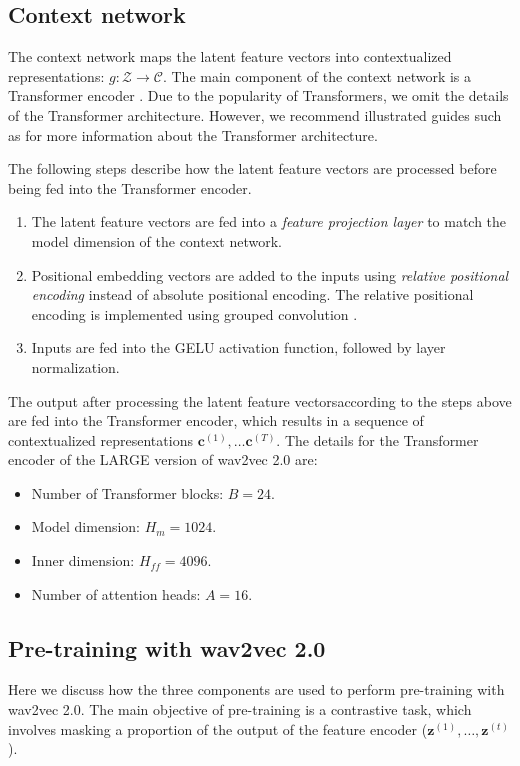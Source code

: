 \subsection{Context network}
The context network maps the latent feature vectors into contextualized representations: $g: \mathcal{Z} \rightarrow \mathcal{C}$.
The main component of the context network is a Transformer encoder \cite{transformer}.
Due to the popularity of Transformers, we omit the details of the Transformer architecture.
However, we recommend illustrated guides such as \cite{alammar2018illustrated} for more information about the Transformer architecture.

The following steps describe how the latent feature vectors are processed before being fed into the Transformer encoder.
\begin{enumerate}
    \item The latent feature vectors are fed into a \emph{feature projection layer} to match the model dimension of the context network.
    \item Positional embedding vectors are added to the inputs using \emph{relative positional encoding} \cite{shaw2018relative} instead of absolute positional encoding.
    The relative positional encoding is implemented using grouped convolution \cite{AlexNet}.
    \item Inputs are fed into the GELU activation function, followed by layer normalization.
\end{enumerate}

The output after processing the latent feature vectorsaccording to the steps above are fed into the Transformer encoder, which results in
a sequence of contextualized representations $\mathbf{c}^{(1)}, \dots \mathbf{c}^{(T)}$.
The details for the Transformer encoder of the \textsc{LARGE} version of wav2vec 2.0 are:
\begin{itemize}
    \item Number of Transformer blocks: $B = 24$.
    \item Model dimension: $H_m = 1024$.
    \item Inner dimension: $H_{ff} = 4096$.
    \item Number of attention heads: $A = 16$.
\end{itemize}

\subsection{Pre-training with wav2vec 2.0}
Here we discuss how the three components are used to perform pre-training with wav2vec 2.0.
The main objective of pre-training is a contrastive task, which involves masking a proportion of the output of the feature encoder ($\mathbf{z}^{(1)}, \dots, \mathbf{z}^{(t)}$).

